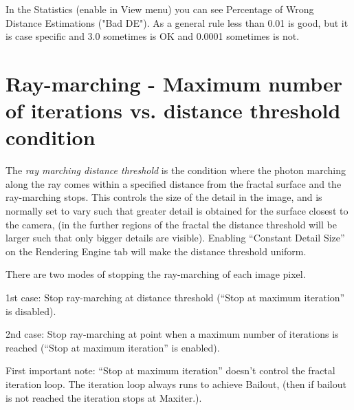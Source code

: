 In the Statistics (enable in View menu) you can see Percentage of Wrong
Distance Estimations ("Bad DE"). As a general rule less than 0.01 is
good, but it is case specific and 3.0 sometimes is OK and 0.0001
sometimes is not.

\section{Ray-marching - Maximum number of iterations vs. distance
threshold
condition}\label{ray-marching---maximum-number-of-iterations-vs.-distance-threshold-condition}

The \emph{ray marching distance threshold} is the condition where the
photon marching along the ray comes within a specified distance from the
fractal surface and the ray-marching stops. This controls the size of
the detail in the image, and is normally set to vary such that greater
detail is obtained for the surface closest to the camera, (in the
further regions of the fractal the distance threshold will be larger
such that only bigger details are visible). Enabling ``Constant Detail
Size'' on the Rendering Engine tab will make the distance threshold
uniform.

There are two modes of stopping the ray-marching of each image pixel.

1st case: Stop ray-marching at distance threshold (``Stop at maximum
iteration'' is disabled).

\protect\hypertarget{__DdeLink__1111_813559202}{}{}2nd case: Stop
ray-marching at point when a maximum number of iterations is reached
(``Stop at maximum iteration'' is enabled).

First important note: ``Stop at maximum iteration'' doesn't control the
fractal iteration loop. The iteration loop always runs to achieve
Bailout, (then if bailout is not reached the iteration stops at
Maxiter.).

